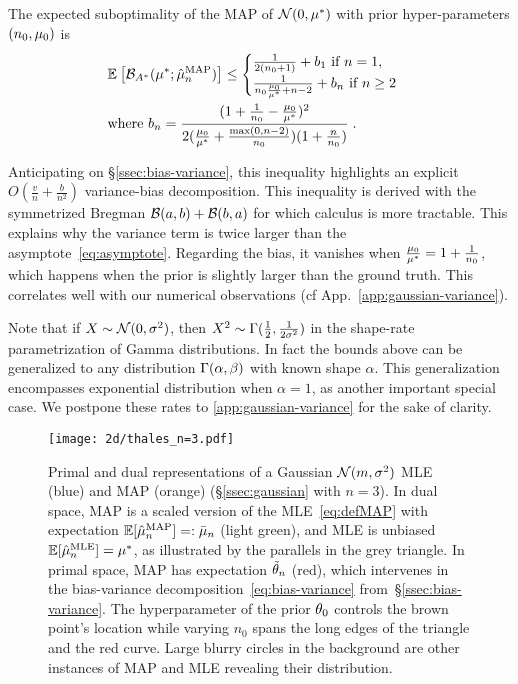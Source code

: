 \begin{theorem}
\label{thm:varianceMAP}
The expected suboptimality of the MAP of ${\mathcal N}(0,\mu^*)$ with prior hyper-parameters $(n_0,\mu_0)$ is
 \begin{align}
	& \mathbb{E}_{} \left[ {\mathcal B}_{A^*}( \mu^*; \hat {\mu}_n^\mathrm{MAP}) \right] 
	\leq \begin{cases}
		\frac{1}{2(n_0+1)}  +  b_1 \ \text{if}\ n=1,\\
		\frac{1}{n_0 \frac{\mu_0}{\mu^*} +n-2} + b_n \ \text{if}\ n\geq 2
	\end{cases}
	\label{eq:MAP_rate}\\
	& \text{where }b_n = \frac{(1 + \frac{1}{n_0} - \frac{\mu_0}{\mu^*})^2}{2 (\frac{\mu_0}{\mu^*}+\frac{\max(0,n-2)}{n_0})(1 + \frac{n}{n_0} )} \; . \nonumber
\end{align}
\end{theorem}
Anticipating on \S\ref{ssec:bias-variance}, this inequality highlights an explicit $O(\frac{v}{n} + \frac{b}{n^2})$ variance-bias decomposition.
This inequality is derived with the symmetrized Bregman ${\mathcal B}(a,b) + {\mathcal B}(b,a)$ for which calculus is more tractable.
This explains why the variance term is twice larger than the asymptote~\eqref{eq:asymptote}.
Regarding the bias, it vanishes when $\frac{\mu_0}{\mu^*} =1 + \frac{1}{n_0} $, which happens when the prior is slightly larger than the ground truth.
This correlates well with our numerical observations (cf App.~\ref{app:gaussian-variance}).

Note that if $X\sim {\mathcal N}(0,\sigma^2)$, then $X^2 \sim \Gamma(\frac{1}{2}, \frac{1}{2\sigma^2})$ in the shape-rate parametrization of Gamma distributions. In fact the bounds above can be generalized to any distribution $\Gamma(\alpha, \beta)$ with known shape $\alpha$.
This generalization encompasses exponential distribution when $\alpha=1$, as another important special case.
 We postpone these rates to \cref{app:gaussian-variance} for the sake of clarity.

\begin{figure*}[t]
	\centering
	\texttt{[image: 2d/thales\_n=3.pdf]}
	\caption[Primal and dual representations of a Gaussian MLE and MAP.]
	{
	Primal and dual representations of a Gaussian ${\mathcal N}(m,\sigma^2)$ MLE (blue) and MAP (orange) (\S\ref{ssec:gaussian} with $n=3$).
	In dual space, MAP is a scaled version of the MLE~\eqref{eq:defMAP} with expectation $\operatorname{\mathbb{E}}[\hat{\mu}_n^\text{MAP}]=:\bar {\mu}_n$ (light green), and MLE is unbiased $\operatorname{\mathbb{E}}[\hat{\mu}_n^\text{MLE}]=\mu^*$, as illustrated by the parallels in the grey triangle.
	In primal space, MAP has expectation $\tilde {\theta}_n$ (red), which intervenes in the bias-variance decomposition~\eqref{eq:bias-variance} from~\S\ref{ssec:bias-variance}.
	The hyperparameter of the prior $\theta_0$ controls the brown point's location while varying $n_0$ spans the long edges of the triangle and the red curve.
	Large blurry circles in the background are other instances of MAP and MLE revealing their distribution.
	}
	\label{fig:thales}
\end{figure*}

